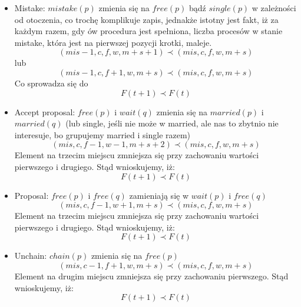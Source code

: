 \documentclass{article}
\begin{document}
    \begin{itemize}
        \item Mistake: $mistake(p)$ zmienia się na $free(p)$ bądź $single(p)$ w zależności od otoczenia, co trochę komplikuje zapis, jednakże 
        istotny jest fakt, iż za każdym razem, gdy ów procedura jest spełniona, liczba procesów w stanie mistake, która jest na pierwszej pozycji krotki, maleje.
        \begin{equation}
            (mis-1,c,f,w,m+s+1) \prec (mis,c,f,w,m+s)
        \end{equation}
        lub
        \begin{equation}
            (mis-1,c,f+1,w,m+s) \prec (mis,c,f,w,m+s)
        \end{equation}
        Co sprowadza się do
        \begin{equation}
            F(t+1) \prec F(t)
        \end{equation}
        \item Accept proposal: $free(p)$ i $wait(q)$ zmienia się na $married(p)$ i $married(q)$ (lub single, jeśli nie może w married, ale
        nas to zbytnio nie interesuje, bo grupujemy married i single razem)
        \begin{equation}
            (mis,c,f-1,w-1,m+s+2) \prec (mis,c,f,w,m+s)
        \end{equation}
        Element na trzecim miejscu zmniejsza się przy zachowaniu wartości pierwszego i drugiego. Stąd wnioskujemy, iż:
        \begin{equation}
            F(t+1) \prec F(t)
        \end{equation}
        \item Proposal: $free(p)$ i $free(q)$ zamieniają się w $wait(p)$ i $free(q)$
        \begin{equation}
            (mis,c,f-1,w+1,m+s) \prec (mis,c,f,w,m+s)
        \end{equation}
        Element na trzecim miejscu zmniejsza się przy zachowaniu wartości pierwszego i drugiego. Stąd wnioskujemy, iż:
        \begin{equation}
            F(t+1) \prec F(t)
        \end{equation}
        \item Unchain: $chain(p)$ zmienia się na $free(p)$
        \begin{equation}
            (mis,c-1,f+1,w,m+s) \prec (mis,c,f,w,m+s)
        \end{equation}
        Element na drugim miejscu zmniejsza się przy zachowaniu pierwszego. Stąd wnioskujemy, iż:
        \begin{equation}
            F(t+1) \prec F(t)
        \end{equation}
    \end{itemize}
\end{document}
